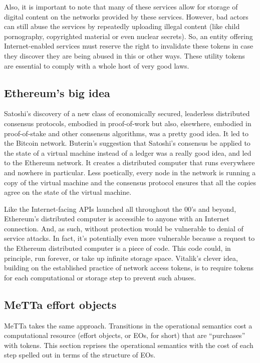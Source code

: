 Also, it is important to note that many of these services allow for storage of digital content on the networks provided by these services. However, bad actors can still abuse the services by repeatedly uploading illegal content (like child pornography, copyrighted material or even nuclear secrets). So, an entity offering Internet-enabled services must reserve the right to invalidate these tokens in case they discover they are being abused in this or other ways. These utility tokens are essential to comply with a whole host of very good laws.

\subsection{Ethereum’s big idea}
Satoshi’s discovery of a new class of economically secured, leaderless distributed consensus protocols, embodied in proof-of-work but also, elsewhere, embodied in proof-of-stake and other consensus algorithms, was a pretty good idea. It led to the Bitcoin network. Buterin’s suggestion that Satoshi’s consensus be applied to the state of a virtual machine instead of a ledger was a really good idea, and led to the Ethereum network. It creates a distributed computer that runs everywhere and nowhere in particular. Less poetically, every node in the network is running a copy of the virtual machine and the consensus protocol ensures that all the copies agree on the state of the virtual machine.

Like the Internet-facing APIs launched all throughout the 00’s and beyond, Ethereum’s distributed computer is accessible to anyone with an Internet connection. And, as such, without protection would be vulnerable to denial of service  attacks. In fact, it’s potentially even more vulnerable because a request to the Ethereum distributed computer is a piece of code. This code could, in principle, run forever, or take up infinite storage space. Vitalik’s clever idea, building on the established practice of network access tokens, is to require tokens for each computational or storage step to prevent such abuses.

\subsection{MeTTa effort objects}
MeTTa takes the same approach. Transitions in the operational semantics cost a computational resource (effort objects, or EOs, for short) that are ``purchases'' with tokens. This section reprises the operational semantics with the cost of each step spelled out in terms of the structure of EOs.

